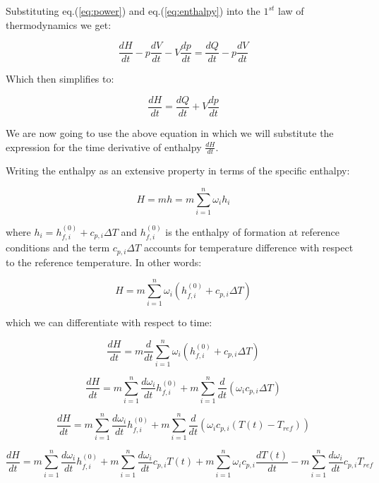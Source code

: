 Substituting eq.(\ref{eq:power}) and eq.(\ref{eq:enthalpy}) into the $1^{st}$ law of thermodynamics we get:

\begin{equation}
\frac{dH}{dt} - p \frac{dV}{dt} - V \frac{dp}{dt} = \frac{dQ}{dt} -p \frac{dV}{dt}
\end{equation}

Which then simplifies to:

\begin{equation} \label{eq:enthalpy-from-1st-law}
\frac{dH}{dt}  = \frac{dQ}{dt} + V \frac{dp}{dt}
\end{equation}

We are now going to use the above equation in which we will substitute the expression for the time derivative of enthalpy $\frac{dH}{dt}$.

Writing the enthalpy as an extensive property in terms of the specific enthalpy:

\begin{equation}
H = m h = m \sum_{i=1}^n \omega_i h_i
\end{equation}

where $h_i = h_{f,i}^{(0)} + c_{p,i} \Delta T$ and $h_{f,i}^{(0)}$ is the enthalpy of formation at reference conditions and the term $c_{p,i} \Delta T$ accounts for temperature difference with respect to the reference temperature. In other words:

\begin{equation}
H = m \sum_{i=1}^n \omega_i ( h_{f,i}^{(0)} + c_{p,i} \Delta T )
\end{equation}

which we can differentiate with respect to time:

\begin{equation*}
\frac{dH}{dt} = m \frac{d}{dt} \sum_{i=1}^n \omega_i ( h_{f,i}^{(0)} + c_{p,i} \Delta T )
\end{equation*}

\begin{equation*}
\frac{dH}{dt} = m \sum_{i=1}^n  \frac{d \omega_i}{dt}  h_{f,i}^{(0)}  + m \sum_{i=1}^n \frac{d}{dt} ( \omega_i c_{p,i} \Delta T )
\end{equation*}

\begin{equation*}
\frac{dH}{dt} = m \sum_{i=1}^n  \frac{d \omega_i}{dt}  h_{f,i}^{(0)}  + m \sum_{i=1}^n \frac{d}{dt} ( \omega_i c_{p,i} (T(t) - T_{ref}) )
\end{equation*}

\begin{equation*}
\frac{dH}{dt} = m \sum_{i=1}^n  \frac{d \omega_i}{dt}  h_{f,i}^{(0)}  + m \sum_{i=1}^n \frac{d \omega_i}{dt} c_{p,i} T(t) + m \sum_{i=1}^n \omega_i c_{p,i} \frac{d T(t)}{dt}  - m \sum_{i=1}^n \frac{d \omega_i}{dt} c_{p,i} T_{ref}
\end{equation*}

